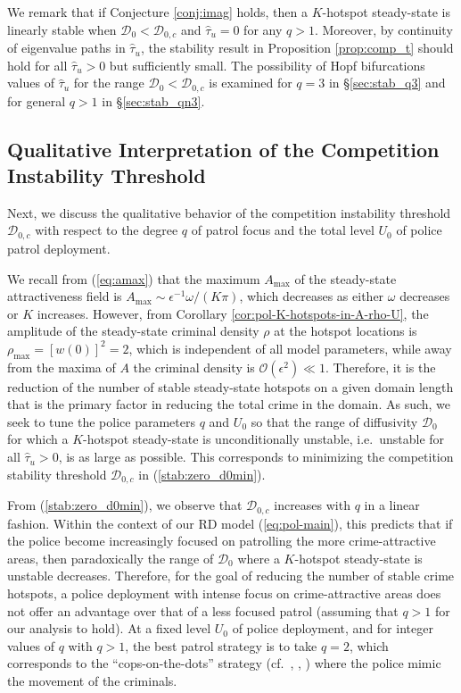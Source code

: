\documentclass{article}%
\begin{document}
We remark that if Conjecture \ref{conj:imag} holds, then a $K$-hotspot
steady-state is linearly stable when ${\mathcal D}_0<{\mathcal
  D}_{0,c}$ and $\hat{\tau}_u=0$ for any $q>1$. Moreover, by
continuity of eigenvalue paths in $\hat{\tau}_u$, the stability result
in Proposition \ref{prop:comp_t} should hold for all $\hat{\tau}_u>0$
but sufficiently small. The possibility of Hopf bifurcations values of
$\hat{\tau}_u$ for the range ${\mathcal D}_0<{\mathcal D}_{0,c}$ is
examined for $q=3$ in \S \ref{sec:stab_q3} and for general $q>1$ in
\S \ref{sec:stab_qn3}.

\subsection{Qualitative Interpretation of the Competition Instability Threshold}\label{sec:qual_comp_d}

Next, we discuss the qualitative behavior of the competition instability
threshold ${\mathcal D}_{0,c}$ with respect to the degree $q$
of patrol focus and the total level $U_0$ of police patrol deployment.

We recall from (\ref{eq:amax}) that the maximum $A_{\max}$ of the
steady-state attractiveness field is $A_{\max}\sim
\epsilon^{-1}{\omega/(K\pi)}$, which decreases as either $\omega$
decreases or $K$ increases. However, from Corollary
\ref{cor:pol-K-hotspots-in-A-rho-U}, the amplitude of the steady-state
criminal density $\rho$ at the hotspot locations is
$\rho_{\max}=\left[w(0)\right]^2=2$, which is independent of all model
parameters, while away from the maxima of $A$ the criminal density is
${\mathcal O}(\epsilon^{2})\ll 1$. Therefore, it is the reduction of
the number of stable steady-state hotspots on a given domain length
that is the primary factor in reducing the total crime in the
domain. As such, we seek to tune the police parameters $q$ and $U_{0}$
so that the range of diffusivity ${\mathcal D}_{0}$ for which a
$K$-hotspot steady-state is unconditionally unstable, i.e.~unstable
for all $\hat{\tau}_u>0$, is as large as possible. This corresponds to
minimizing the competition stability threshold ${\mathcal D}_{0,c}$
in (\ref{stab:zero_d0min}).

From (\ref{stab:zero_d0min}), we observe that ${\mathcal D}_{0,c}$
increases with $q$ in a linear fashion. Within the context of our RD
model (\ref{eq:pol-main}), this predicts that if the police become
increasingly focused on patrolling the more crime-attractive areas,
then paradoxically the range of ${\mathcal D}_{0}$ where a $K$-hotspot
steady-state is unstable decreases. Therefore, for the goal of
reducing the number of stable crime hotspots, a police deployment with
intense focus on crime-attractive areas does not offer an advantage
over that of a less focused patrol (assuming that $q>1$ for our
analysis to hold). At a fixed level $U_0$ of police deployment, and for
integer values of $q$ with $q>1$, the best patrol strategy
is to take $q=2$, which corresponds to the ``cops-on-the-dots''
strategy (cf.~\cite{jbc}, \cite{rick}, \cite{zipkin}) where the police
mimic the movement of the criminals.
\end{document}
